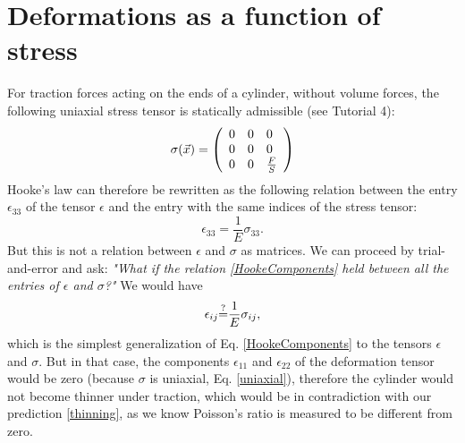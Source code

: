 \documentclass[DIV=12]{article}
\newcommand{\whatIf}{\operatornamewithlimits{=}}
\begin{document}
\section{Deformations as a function of stress}

 For traction forces acting on the ends of  a cylinder,
without volume forces, the following uniaxial stress tensor is statically admissible (see Tutorial 4):
\[
\sigma(\vec{x})=  \left(
   \begin{array}{l l l}
      0  & 0   & 0 \\
      0 & 0  & 0\\
      0 & 0 & \frac{F}{S}
   \end{array}
   \right)
\label{uniaxial}
\]
Hooke's law can therefore be rewritten as the following relation between the entry $\epsilon_{33}$
 of the tensor $\epsilon$ and the entry with the same indices of the stress tensor:
\begin{equation}
\epsilon_{33} = \frac{1}{E} \sigma_{33}.
\label{HookeComponents}
\end{equation}
But this is not a relation between $\epsilon$ and $\sigma$ as matrices. We can 
 proceed by trial-and-error and ask: {\emph{"What if the relation \ref{HookeComponents} 
 held between all the entries of $\epsilon$ and $\sigma$?"}}
We would have  
\begin{equation}
\epsilon_{ij} {\whatIf^?}  \frac{1}{E} \sigma_{ij},
\label{HookeWhatIf}
\end{equation}
 which is the simplest generalization of Eq. \ref{HookeComponents} to the tensors  $\epsilon$
 and $\sigma$. But in that case, the components $\epsilon_{11}$ and $\epsilon_{22}$ of
 the deformation tensor would be zero (because $\sigma$ is uniaxial, Eq. \ref{uniaxial}), therefore the cylinder would not become thinner
 under traction, which would be in contradiction with our prediction \ref{thinning}, as we know Poisson's ratio is measured to be different 
 from zero.\\
\end{document}
